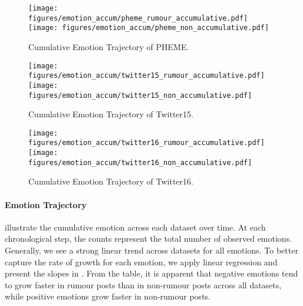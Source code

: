 \begin{figure}[t!]
    \centering
    \texttt{[image: figures/emotion\_accum/pheme\_rumour\_accumulative.pdf]}
    \texttt{[image: figures/emotion\_accum/pheme\_non\_accumulative.pdf]}
    \caption{Cumulative Emotion Trajectory of PHEME.}
\label{fig:pheme_accum}
\end{figure}

\begin{figure}[t!]
    \centering
    \texttt{[image: figures/emotion\_accum/twitter15\_rumour\_accumulative.pdf]}
    \texttt{[image: figures/emotion\_accum/twitter15\_non\_accumulative.pdf]}
    \caption{Cumulative Emotion Trajectory of Twitter15.}
\label{fig:twitter15_accum}
\end{figure}

\begin{figure}[t!]
    \centering
    \texttt{[image: figures/emotion\_accum/twitter16\_rumour\_accumulative.pdf]}
    \texttt{[image: figures/emotion\_accum/twitter16\_non\_accumulative.pdf]}
    \caption{Cumulative Emotion Trajectory of Twitter16.}
\label{fig:twitter16_accum}
\end{figure}

\paragraph{Emotion Trajectory}
 illustrate the cumulative emotion across each dataset over time. At each chronological step, the counts represent the total number of observed emotions. Generally, we see a strong linear trend across datasets for all emotions. To better capture the rate of growth for each emotion, we apply linear regression and present the slopes in . From the table, it is apparent that negative emotions tend to grow faster in rumour posts than in non-rumour posts across all datasets, while positive emotions grow faster in non-rumour posts. 


